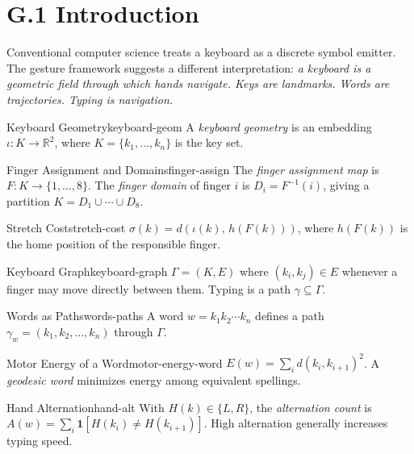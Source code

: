 
\section*{G.1 Introduction}

Conventional computer science treats a keyboard as a discrete symbol emitter.
The gesture framework suggests a different interpretation: \emph{a keyboard
is a geometric field through which hands navigate. Keys are landmarks.
Words are trajectories. Typing is navigation.}

\begin{definition}{Keyboard Geometry}{keyboard-geom}
  A \emph{keyboard geometry} is an embedding $\iota : K \to \mathbb{R}^2$,
  where $K = \{k_1, \ldots, k_n\}$ is the key set.
\end{definition}

\begin{definition}{Finger Assignment and Domains}{finger-assign}
  The \emph{finger assignment map} is $F : K \to \{1,\ldots,8\}$.
  The \emph{finger domain} of finger $i$ is $D_i = F^{-1}(i)$,
  giving a partition $K = D_1 \cup \cdots \cup D_8$.
\end{definition}

\begin{definition}{Stretch Cost}{stretch-cost}
  $\sigma(k) = d(\iota(k),\, h(F(k)))$, where $h(F(k))$ is the home
  position of the responsible finger.
\end{definition}

\begin{definition}{Keyboard Graph}{keyboard-graph}
  $\Gamma = (K,E)$ where $(k_i,k_j) \in E$ whenever a finger may
  move directly between them. Typing is a path $\gamma \subseteq \Gamma$.
\end{definition}

\begin{definition}{Words as Paths}{words-paths}
  A word $w = k_1 k_2 \cdots k_n$ defines a path
  $\gamma_w = (k_1, k_2, \ldots, k_n)$ through $\Gamma$.
\end{definition}

\begin{definition}{Motor Energy of a Word}{motor-energy-word}
  $E(w) = \sum_i d(k_i, k_{i+1})^2$.
  A \emph{geodesic word} minimizes energy among equivalent spellings.
\end{definition}

\begin{definition}{Hand Alternation}{hand-alt}
  With $H(k) \in \{L,R\}$, the \emph{alternation count} is
  $A(w) = \sum_i \mathbf{1}[H(k_i) \neq H(k_{i+1})]$.
  High alternation generally increases typing speed.
\end{definition}

